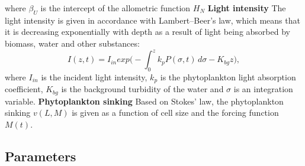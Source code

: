 where $\beta_U$ is the intercept of the allometric function $H_N$
\newline
\newline
\textbf{Light intensity}
\newline
The light intensity is given in accordance with Lambert–Beer’s law, which means that it is decreasing exponentially with depth as a result of light being absorbed by biomass, water and other substances:
\begin{equation}
    \label{eq:light}
    I(z,t) = I_{in}exp \bigg( - \int_{0}^{z} k_{p}P(\sigma,t) \,d \sigma - K_{bg}z \bigg),
\end{equation}
where $I_{in}$ is the incident light intensity, $k_p$ is the phytoplankton light absorption coefficient, $K_{bg}$ is the background turbidity of the water and $\sigma$ is an integration variable. 
\newline
\newline
\textbf{Phytoplankton sinking}
\newline
Based on Stokes' law, the phytoplankton sinking $v(L,M)$ is given as a function of cell size and the forcing function $M(t)$.


\subsection{Parameters}